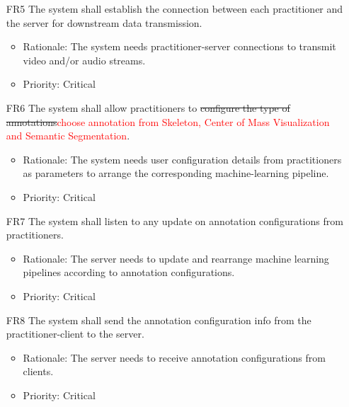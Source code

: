 \documentclass[12pt]{article}
\begin{document}
\begin{itemize}
    \item[FR5] The system shall establish the connection between each practitioner and the server for downstream data transmission. \label{FR5}
    \begin{itemize}
        \item Rationale: The system needs practitioner-server connections to transmit video and/or audio streams.
        \item Priority: Critical
    \end{itemize}
\end{itemize}
\begin{itemize}
    \item[FR6] The system shall allow practitioners to \sout{configure the type of annotations}\textcolor{red}{choose annotation from Skeleton, Center of Mass Visualization and Semantic Segmentation}. \label{FR6}
    \begin{itemize}
        \item Rationale: The system needs user configuration details from practitioners as parameters to arrange the corresponding machine-learning pipeline.
        \item Priority: Critical
    \end{itemize}
\end{itemize}
\begin{itemize}
    \item[FR7] The system shall listen to any update on annotation configurations from practitioners. \label{FR7}
    \begin{itemize}
        \item Rationale: The server needs to update and rearrange machine learning pipelines according to annotation configurations.
        \item Priority: Critical
    \end{itemize}
\end{itemize}
\begin{itemize}
    \item[FR8] The system shall send the annotation configuration info from the practitioner-client to the server. \label{FR8}
    \begin{itemize}
        \item Rationale: The server needs to receive annotation configurations from clients.
        \item Priority: Critical
    \end{itemize}
\end{itemize}
\end{document}
